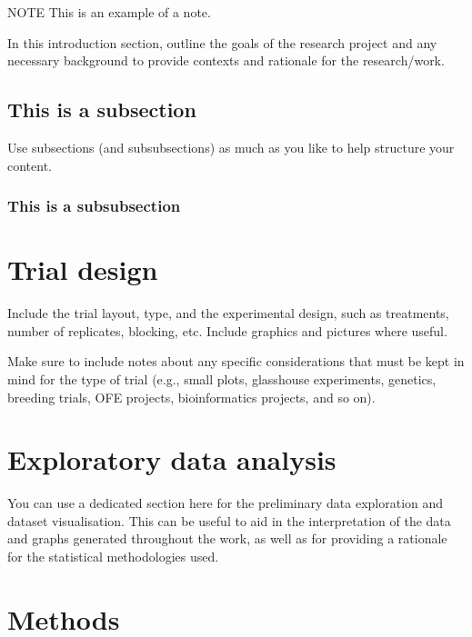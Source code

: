 \documentclass[12pt]{article}
\begin{document}
  \begin{note}
    {\sbf\color{aagiteal!75!black}  NOTE}\quad
    This is an example of a note.
  \end{note}
  
  \vspace*{1cm}  
  
  In this introduction section, outline the goals of the research project and
  any necessary background to provide contexts and rationale for the
  research/work.

  \subsection{This is a subsection}
  
  Use subsections (and subsubsections) as much as you like to help structure
  your content.

  \subsubsection{This is a subsubsection}

  \clearpage
  \section{Trial design}
  
  Include the trial layout, type, and the experimental design, such as treatments,
  number of replicates, blocking, etc. Include graphics and pictures where useful.
  
  Make sure to include notes about any specific considerations that must be kept
  in mind for the type of trial (e.g., small plots, glasshouse experiments,
  genetics, breeding trials, OFE projects, bioinformatics projects, and so on).
  
  \clearpage
  \section{Exploratory data analysis}
  
  You can use a dedicated section here for the preliminary data exploration and
  dataset visualisation. This can be useful to aid in the interpretation of the
  data and graphs generated throughout the work, as well as for providing a
  rationale for the statistical methodologies used.  
  
  \clearpage
  \section{Methods}
  
\end{document}
